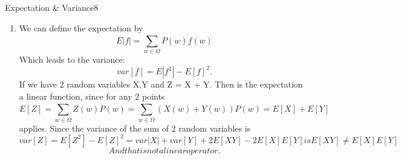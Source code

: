 \begin{questions}
	
	\begin{question}{Expectation \& Variance}{8}		
	\begin{answer} 
			\begin{enumerate}
		\item We can define the expectation by \begin{equation}
 E \vert f \vert =    \sum\limits_{w \in\Omega }^{ }  P(w) f(w) 
\end{equation}
Which leads to the variance:
\begin{equation}
 var\left[ f \right] = E\left\lvert f^2 \right\rvert - E \left[ f \right]^2.
\end{equation}
 If we have 2 random variables X,Y and Z = X + Y. 
Then is the expectation a linear function, since for any 2 points 
\begin{equation}
E\left[ Z \right] = \sum\limits_{w \in\Omega }^{ }  Z(w) P(w)  = \sum\limits_{w \in\Omega }^{ } (X(w)+ Y(w))P(w) = E\left[ X \right] + E\left[ Y \right]
\end{equation}
applies. Since the variance of the sum of 2 random variables is 
\begin{equation}
var\left[ Z \right] = E\left[ Z^2 \right] - E\left[ Z \right]^2 = var\left\lvert X \right\rvert + var\left[ Y \right] + 2E\left[ XY \right] - 2E\left[ X \right]E\left[ Y \right] is E\left[ XY \right] \neq E\left[ X \right] E\left[ Y \right] 
\end{equation}
\begin{equation}
And that is not a linear operator.
\end{equation}


\end{enumerate}
\end{answer}
\end{question}
\end{questions}
